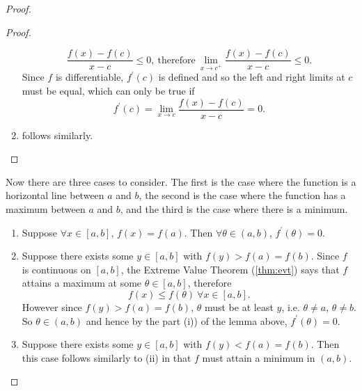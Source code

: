 \documentclass[../real_analysis.tex]{subfiles}
\begin{document}
\begin{proof}
\begin{proof}
\begin{enumerate}[label={\upshape(\roman*)}]
\begin{equation}
                            \frac{f(x)-f(c)}{x-c}\leq0,\ \text{therefore}\ \lim_{x\to c^+}\frac{f(x)-f(c)}{x-c}\leq0.
                        \end{equation}
                        Since $f$ is differentiable, $f^\prime(c)$ is defined and so the left and right limits at $c$ must be equal, which can only be true if
                        \begin{equation}
                            f^\prime(c)=\lim_{x\to c}\frac{f(x)-f(c)}{x-c}=0.
                        \end{equation}
                        \item follows similarly.
                    \end{enumerate}
                \end{proof}
                Now there are three cases to consider. The first is the case where the function is a horizontal line between $a$ and $b$, the second is the case where the function has a maximum between $a$ and $b$, and the third is the case where there is a minimum.
                \begin{enumerate}[label={\upshape(\roman*)}]
                    \item Suppose $\forall x\in[a,b]$, $f(x)=f(a)$. Then $\forall\theta\in(a,b)$, $f^\prime(\theta)=0$.
                    \item Suppose there exists some $y\in[a,b]$ with $f(y)>f(a)=f(b)$. Since $f$ is continuous on $[a,b]$, the Extreme Value Theorem (\ref{thm:evt}) says that $f$ attains a maximum at some $\theta\in[a,b]$, therefore
                    \begin{equation}
                        f(x)\leq f(\theta)\ \forall x\in[a,b].
                    \end{equation}
                    However since $f(y)>f(a)=f(b)$, $\theta$ must be at least $y$, i.e. $\theta\neq a$, $\theta\neq b$. So $\theta\in(a,b)$ and hence by the part (i)) of the lemma above, $f^\prime(\theta)=0$.
                    \item Suppose there exists some $y\in[a,b]$ with $f(y)<f(a)=f(b)$. Then this case follows similarly to (ii) in that $f$ must attain a minimum in $(a,b)$.
                \end{enumerate}
            \end{proof}
\end{document}
